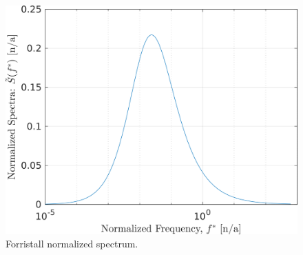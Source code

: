 \documentclass[11pt]{article}
\begin{document}
\begin{figure}[h!]
  \centering
  \includegraphics[width=\SFc\textwidth]{forristall_norm.png}
  \caption{Forristall normalized spectrum.}
  \label{f:forristall_norm}
\end{figure}
\end{document}
